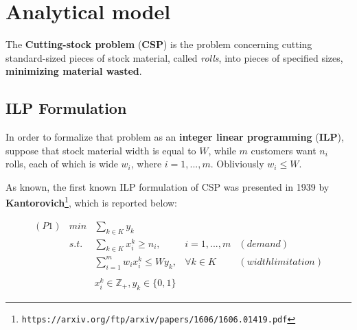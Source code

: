 \documentclass[10pt,a4paper]{article}
\begin{document}
\begin{frontespizio} 
\end{frontespizio} 

\tableofcontents
\newpage


\section{Analytical model}

The \textbf{Cutting-stock problem} (\textbf{CSP}) is the problem concerning cutting standard-sized pieces of stock material, called \textit{rolls}, into pieces of specified sizes, \textbf{minimizing material wasted}.

\subsection{ILP Formulation}

In order to formalize that problem as an \textbf{integer linear programming} (\textbf{ILP}), suppose that stock material width is equal to $W$, while $m$ customers want $n_i$ rolls, each of which is wide $w_i$, where $i = 1,...,m$. Obliviously $w_i \leq W$.

As known, the first known ILP formulation of CSP was presented in 1939 by \textbf{Kantorovich}\footnote{\texttt{https://arxiv.org/ftp/arxiv/papers/1606/1606.01419.pdf}}, which is reported below:


\begin{equation}\label{eqn:P1}
\begin{array} {lllrr} 

(P1) & min & \displaystyle\sum_{k \in K} y_k && \\
& s.t. & \displaystyle\sum_{k \in K} x_i^k \geq n_i, & i = 1,...,m & (demand) \\
&& \displaystyle\sum_{i = 1}^m w_i x_i^k \leq W y_k, & \forall k \in K & (width limitation) \\\\
&& x_i^k \in \mathbb{Z}_{+}, y_k \in \lbrace 0, 1 \rbrace &&
\end{array}
\end{equation}
\end{document}

